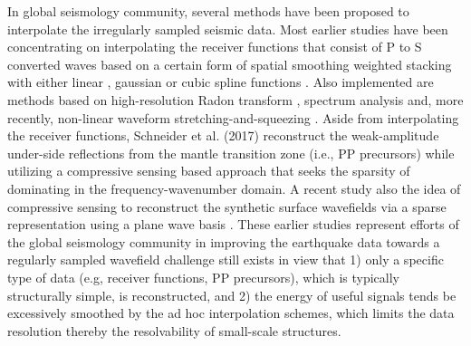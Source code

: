 In global seismology community, several methods have been proposed to interpolate the irregularly sampled seismic data. Most earlier studies have been concentrating on interpolating the receiver functions \cite{langston1977effect} that consist of P to S converted waves based on a certain form of spatial smoothing  weighted stacking with either linear \cite{chengping2015}, gaussian \cite{neal1999imaging, song2017moho} or cubic spline functions \cite{sheldrake2002regional, zhang2014receiver}. Also implemented are methods based on high-resolution Radon transform \cite{wilson2007teleseismic},  spectrum analysis \cite{gu2015sharp, dokht2016singular} and, more recently, non-linear waveform stretching-and-squeezing \cite{hu2018wavefield}.  Aside from interpolating the receiver functions, Schneider et al. (2017) \cite{schneider2017improvement} reconstruct the weak-amplitude under-side reflections from the mantle transition zone (i.e., PP precursors) while utilizing a compressive sensing based approach that seeks the sparsity of dominating  in the frequency-wavenumber domain.  A recent study also  the idea of compressive sensing to reconstruct the synthetic surface wavefields via a sparse representation using a plane wave basis \cite{zhan2018application}.  These earlier studies represent  efforts of the global seismology community in improving the earthquake data towards a regularly sampled wavefield challenge still exists in view that 1) only a specific type of data (e.g, receiver functions, PP precursors), which is typically structurally simple, is reconstructed, and 2) the energy of useful signals tends  be excessively smoothed by the ad hoc interpolation schemes, which limits the data resolution thereby the resolvability of small-scale structures.  

